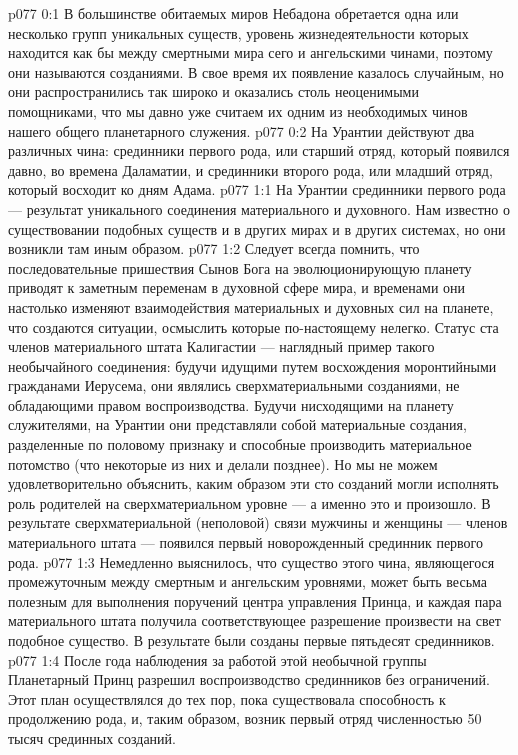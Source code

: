 \author{Архангел}
\vs p077 0:1 В большинстве обитаемых миров Небадона обретается одна или несколько групп уникальных существ, уровень жизнедеятельности которых находится как бы между смертными мира сего и ангельскими чинами, поэтому они называются  созданиями. В свое время их появление казалось случайным, но они распространились так широко и оказались столь неоценимыми помощниками, что мы давно уже считаем их одним из необходимых чинов нашего общего планетарного служения.
\vs p077 0:2 На Урантии действуют два различных чина: срединники первого рода, или старший отряд, который появился давно, во времена Даламатии, и срединники второго рода, или младший отряд, который восходит ко дням Адама.
\vs p077 1:1 На Урантии срединники первого рода --- результат уникального соединения материального и духовного. Нам известно о существовании подобных существ и в других мирах и в других системах, но они возникли там иным образом.
\vs p077 1:2 Следует всегда помнить, что последовательные пришествия Сынов Бога на эволюционирующую планету приводят к заметным переменам в духовной сфере мира, и временами они настолько изменяют взаимодействия материальных и духовных сил на планете, что создаются ситуации, осмыслить которые по\hyp{}настоящему нелегко. Статус ста членов материального штата Калигастии --- наглядный пример такого необычайного соединения: будучи идущими путем восхождения моронтийными гражданами Иерусема, они являлись сверхматериальными созданиями, не обладающими правом воспроизводства. Будучи нисходящими на планету служителями, на Урантии они представляли собой материальные создания, разделенные по половому признаку и способные производить материальное потомство (что некоторые из них и делали позднее). Но мы не можем удовлетворительно объяснить, каким образом эти сто созданий могли исполнять роль родителей на сверхматериальном уровне --- а именно это и произошло. В результате сверхматериальной (неполовой) связи мужчины и женщины --- членов материального штата --- появился первый новорожденный срединник первого рода.
\vs p077 1:3 Немедленно выяснилось, что существо этого чина, являющегося промежуточным между смертным и ангельским уровнями, может быть весьма полезным для выполнения поручений центра управления Принца, и каждая пара материального штата получила соответствующее разрешение произвести на свет подобное существо. В результате были созданы первые пятьдесят срединников.
\vs p077 1:4 После года наблюдения за работой этой необычной группы Планетарный Принц разрешил воспроизводство срединников без ограничений. Этот план осуществлялся до тех пор, пока существовала способность к продолжению рода, и, таким образом, возник первый отряд численностью 50 тысяч срединных созданий.
